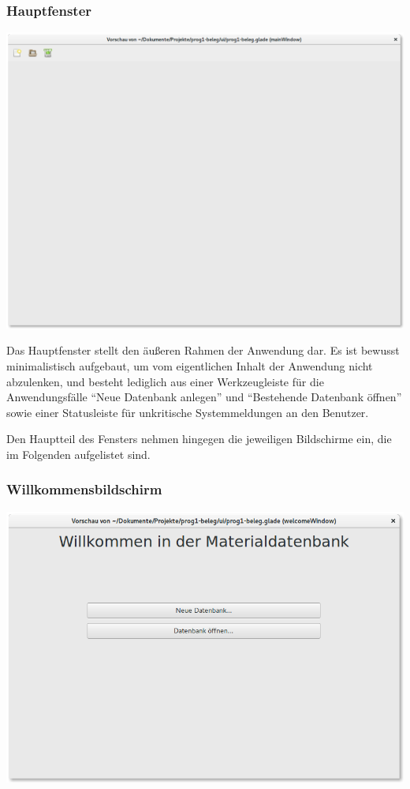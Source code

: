 \subsubsection{Hauptfenster}
\begin{center}
\noindent\includegraphics[width=150mm,keepaspectratio]{images/04-hauptfenster.png}
\end{center}

Das Hauptfenster stellt den äußeren Rahmen der Anwendung dar. Es ist bewusst minimalistisch aufgebaut, um vom eigentlichen
Inhalt der Anwendung nicht abzulenken, und besteht lediglich aus einer Werkzeugleiste für die Anwendungsfälle
``Neue Datenbank anlegen'' und ``Bestehende Datenbank öffnen'' sowie einer Statusleiste
für unkritische Systemmeldungen an den Benutzer.

Den Hauptteil des Fensters nehmen hingegen die jeweiligen Bildschirme ein, die im Folgenden aufgelistet sind.

\subsubsection{Willkommensbildschirm}
\begin{center}
\noindent\includegraphics[width=150mm,keepaspectratio]{images/05-willkommensbildschirm.png}
\end{center}

